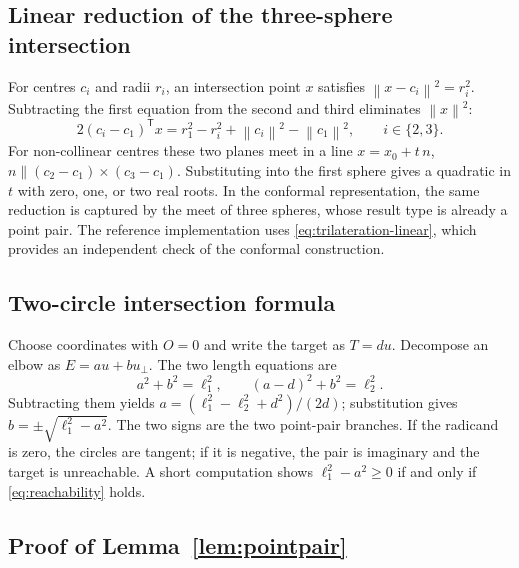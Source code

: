 \documentclass[11pt,a4paper]{article}
\theoremstyle{plain}
\theoremstyle{definition}
\theoremstyle{remark}
\newcommand{\T}{\mathsf{T}}
\newcommand{\norm}[1]{\left\lVert#1\right\rVert}
\begin{document}
\subsection{Linear reduction of the three-sphere intersection}\label{app:trilateration}

For centres $c_i$ and radii $r_i$, an intersection point $x$ satisfies
$\norm{x-c_i}^2=r_i^2$. Subtracting the first equation from the second and third
eliminates $\norm{x}^2$:
\begin{equation}
  2(c_i-c_1)^{\T}x
  =r_1^2-r_i^2+\norm{c_i}^2-\norm{c_1}^2,
  \qquad i\in\{2,3\}.
  \label{eq:trilateration-linear}
\end{equation}
For non-collinear centres these two planes meet in a line
$x=x_0+t\,n$, $n\parallel(c_2-c_1)\times(c_3-c_1)$. Substituting into the
first sphere gives a quadratic in $t$ with zero, one, or two real roots. In the
conformal representation, the same reduction is captured by the meet of three
spheres, whose result type is already a point pair. The reference implementation
uses \cref{eq:trilateration-linear}, which provides an independent check of the
conformal construction.

\subsection{Two-circle intersection formula}

Choose coordinates with $O=0$ and write the target as $T=du$. Decompose an elbow
as $E=au+bu_{\perp}$. The two length equations are
\begin{equation}
  a^2+b^2=\ell_1^2,
  \qquad
  (a-d)^2+b^2=\ell_2^2 .
\end{equation}
Subtracting them yields $a=(\ell_1^2-\ell_2^2+d^2)/(2d)$; substitution gives
$b=\pm\sqrt{\ell_1^2-a^2}$. The two signs are the two point-pair branches. If the
radicand is zero, the circles are tangent; if it is negative, the pair is
imaginary and the target is unreachable. A short computation shows
$\ell_1^2-a^2\ge0$ if and only if \cref{eq:reachability} holds.

\subsection{Proof of Lemma~\ref{lem:pointpair}}\label{app:pointpair}
\end{document}
